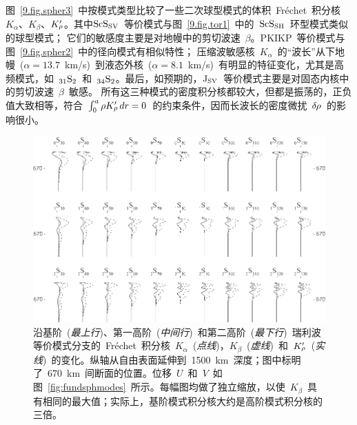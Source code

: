 图~\ref{9.fig.spher3}~中按模式类型比较了一些二次球型模式的体积~Fr\'{e}chet~积分核~$K_{\alpha}$、$K_{\beta}$、$K_{\raisebox{0.3 ex}{\scriptsize$\rho$}}^{\prime}$。其中${\rm ScS}_{\rm SV}$~等价模式与图~\ref{9.fig.tor1}~中的~${\rm ScS}_{\rm SH}$~环型模式类似的球型模式；
%
%
它们的敏感度主要是对地幔中的剪切波速~$\beta$。PKIKP~等价模式与图~\ref{9.fig.spher2}~中的径向模式有相似特性；
%
%
\enlargethispage{-0.5\baselineskip}
压缩波敏感核~$K_{\alpha}$~的“波长”从下地幔~($\alpha=13.7$~km/s)~到液态外核~($\alpha=8.1$~km/s)~有明显的特征变化，尤其是高频模式，如~${}_{31}{\rm S}_2$~和~${}_{34}{\rm S}_2$。最后，如预期的，${\rm J}_{\rm SV}$~等价模式主要是对固态内核中的剪切波速~$\beta$~敏感。
%
%
所有这三种模式的密度积分核都较大，但都是振荡的，正负值大致相等，符合~$\int_0^a\rho K_{\raisebox{0.3 ex}{\scriptsize$\rho$}}^{\prime}\,dr=0$~的约束条件，因而长波长的密度微扰~$\delta\hspace{-0.2 mm}\rho$~的影响很小。
\begin{figure}[!t]
\begin{center}
\includegraphics{../figures/chap09/fig09.eps}
\end{center}
\caption[Raymodekernels]{\label{9.fig.Ray}
沿基阶~({\em 最上行\/})、第一高阶~({\em 中间行\/})~和第二高阶~({\em 最下行\/})~瑞利波等价模式分支的~Fr\'{e}chet~积分核~$K_{\alpha}$~({\em 点线\/})，$K_{\beta}$~({\em 虚线\/})~和~$K_{\raisebox{0.3 ex}{\scriptsize$\rho$}}^{\prime}$~({\em 实线\/})~的变化。纵轴从自由表面延伸到~1500~km~深度；图中标明了~670~km~间断面的位置。位移~$U$~和~$V$~如图~\ref{fig:fundsphmodes}~所示。每幅图均做了独立缩放，以使~$K_{\beta}$~具有相同的最大值；实际上，基阶模式积分核大约是高阶模式积分核的三倍。
}
\end{figure}

